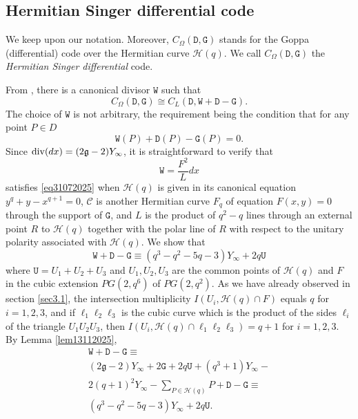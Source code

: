 \documentclass[9pt]{article}
\theoremstyle{plain}
\newtheorem{rem}[thm]{Remark}
\begin{document}

\subsection{Hermitian Singer differential code}\label{sec5}
We keep upon our notation. Moreover, $C_\Omega(\mathtt D,\mathtt{G})$ stands for the Goppa (differential) code over the Hermitian curve $\mathcal{H}(q)$. We call $C_\Omega(\mathtt D,\mathtt{G})$ the \emph{Hermitian Singer differential} code. 

From \cite[Theorem 12.17]{P}, there is a canonical divisor $\mathtt{W}$ such that
$$C_\Omega(\mathtt D,{\mathtt{G}})\cong C_L(\mathtt D,{\mathtt{W}}+{\mathtt{D}}-{\mathtt{G}}).$$
The choice of $\mathtt{W}$ is not arbitrary, the requirement being the condition that for any point $P\in D$
\begin{equation}\label{eq31072025}
{\mathtt{W}}(P)+{\mathtt{D}}(P)-{\mathtt{G}}(P)=0.
\end{equation}
 Since ${\rm{div}}(dx)=(2\mathfrak{g}-2)Y_\infty$, it is  straightforward to verify that
$${\mathtt{W}}=\frac{F^2}{L} dx$$
satisfies \eqref{eq31072025} when ${\mathcal{H}}(q)$ is given in its canonical equation $y^q+y-x^{q+1}=0$, $\mathcal{C}$ is another Hermitian curve $F_q$ of equation $F(x,y)=0$ through the support of ${\mathtt{G}}$, and $L$ is the product of $q^2-q$ lines through an external point $R$ to ${\mathcal{H}}(q)$ together with the polar line of $R$ with respect to the unitary polarity associated with ${\mathcal{H}}(q)$.
We show that
$${\mathtt{W}}+{\mathtt{D}}-{\mathtt{G}}\equiv (q^3-q^2-5q-3)Y_\infty+ 2q{\mathtt{U}}$$
where ${\mathtt{U}}=U_1+U_2+U_3$ and $U_1,U_2,U_3$ are the common points of ${\mathcal{H}}(q)$ and $F$ in the cubic extension $PG(2,q^6)$ of $PG(2,q^2)$. As we have already observed in section \ref{sec3.1}, the intersection multiplicity $I(U_i,{\mathcal{H}}(q)\cap F)$ equals $q$ for $i=1,2,3$, and if $\ell_1\ell_2\ell_3$ is the cubic curve which is the product of the sides $\ell_i$ of the triangle $U_1U_2U_3$, then $I(U_{i},{\mathcal{H}}(q)\cap \ell_1\ell_2\ell_3)=q+1$ for $i=1,2,3$.
By Lemma \ref{lem13112025}, 
$$
\begin{array}{ccc}
{\mathtt{W}}+{\mathtt{D}}-{\mathtt{G}}\equiv \\
(2\mathfrak{g}-2)Y_\infty+2{\mathtt{G}}+ 2q{\mathtt{U}}+(q^3+1)Y_\infty-\\
2(q+1)^2Y_\infty
-\sum_{P\in {\mathcal{H}}(q)}P+{\mathtt{D}}-\mathtt{G}\equiv \\
(q^3-q^2-5q-3)Y_\infty+2q\mathtt{U}.
\\
\end{array}$$
\end{document}
